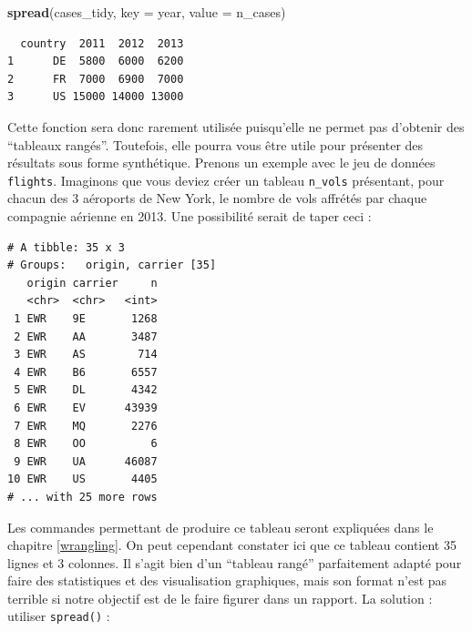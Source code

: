 \documentclass[a4paperpaper,]{article}
\newenvironment{Shaded}{\begin{snugshade}}{\end{snugshade}}
\newcommand{\DataTypeTok}[1]{\textcolor[rgb]{0.00,0.34,0.68}{#1}}
\newcommand{\KeywordTok}[1]{\textcolor[rgb]{0.12,0.11,0.11}{\textbf{#1}}}
\newcommand{\NormalTok}[1]{\textcolor[rgb]{0.12,0.11,0.11}{#1}}
\newcommand{\OperatorTok}[1]{\textcolor[rgb]{0.12,0.11,0.11}{#1}}
\newcommand{\StringTok}[1]{\textcolor[rgb]{0.75,0.01,0.01}{#1}}
\theoremstyle{definition}
\theoremstyle{definition}
\theoremstyle{definition}
\theoremstyle{remark}
\begin{document}
\begin{Shaded}
\begin{Highlighting}[]
\KeywordTok{spread}\NormalTok{(cases_tidy, }\DataTypeTok{key =}\NormalTok{ year, }\DataTypeTok{value =}\NormalTok{ n_cases)}
\end{Highlighting}
\end{Shaded}

\begin{verbatim}
  country  2011  2012  2013
1      DE  5800  6000  6200
2      FR  7000  6900  7000
3      US 15000 14000 13000
\end{verbatim}

Cette fonction sera donc rarement utilisée puisqu'elle ne permet pas
d'obtenir des ``tableaux rangés''. Toutefois, elle pourra vous être
utile pour présenter des résultats sous forme synthétique. Prenons un
exemple avec le jeu de données \texttt{flights}. Imaginons que vous
deviez créer un tableau \texttt{n\_vols} présentant, pour chacun des 3
aéroports de New York, le nombre de vols affrétés par chaque compagnie
aérienne en 2013. Une possibilité serait de taper ceci :

\begin{Shaded}
\end{Shaded}

\begin{verbatim}
# A tibble: 35 x 3
# Groups:   origin, carrier [35]
   origin carrier     n
   <chr>  <chr>   <int>
 1 EWR    9E       1268
 2 EWR    AA       3487
 3 EWR    AS        714
 4 EWR    B6       6557
 5 EWR    DL       4342
 6 EWR    EV      43939
 7 EWR    MQ       2276
 8 EWR    OO          6
 9 EWR    UA      46087
10 EWR    US       4405
# ... with 25 more rows
\end{verbatim}

Les commandes permettant de produire ce tableau seront expliquées dans
le chapitre \ref{wrangling}. On peut cependant constater ici que ce
tableau contient 35 lignes et 3 colonnes. Il s'agit bien d'un ``tableau
rangé'' parfaitement adapté pour faire des statistiques et des
visualisation graphiques, mais son format n'est pas terrible si notre
objectif est de le faire figurer dans un rapport. La solution : utiliser
\texttt{spread()} :
\end{document}
